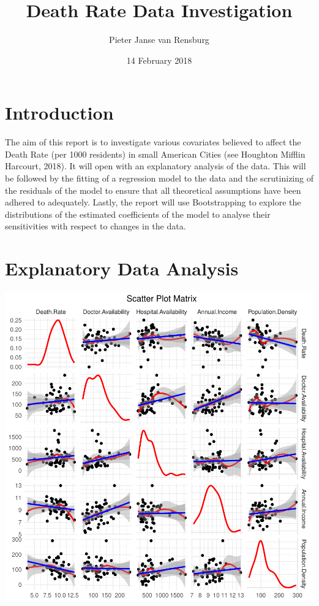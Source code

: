 \documentclass[12pt,]{article}
\title{Death Rate Data Investigation}
\author{Pieter Janse van Rensburg}
\date{14 February 2018}
\begin{document}
\maketitle

{
\setcounter{tocdepth}{2}
\tableofcontents
}
\newpage

\section{Introduction}\label{introduction}

The aim of this report is to investigate various covariates believed to
affect the Death Rate (per 1000 residents) in small American Cities (see
Houghton Mifflin Harcourt, 2018). It will open with an explanatory
analysis of the data. This will be followed by the fitting of a
regression model to the data and the scrutinizing of the residuals of
the model to ensure that all theoretical assumptions have been adhered
to adequately. Lastly, the report will use Bootstrapping to explore the
distributions of the estimated coefficients of the model to analyse
their sensitivities with respect to changes in the data.

\section{Explanatory Data Analysis}\label{explanatory-data-analysis}

\begin{center}\includegraphics{report_files/figure-latex/spm_data-1} \end{center}
\end{document}
